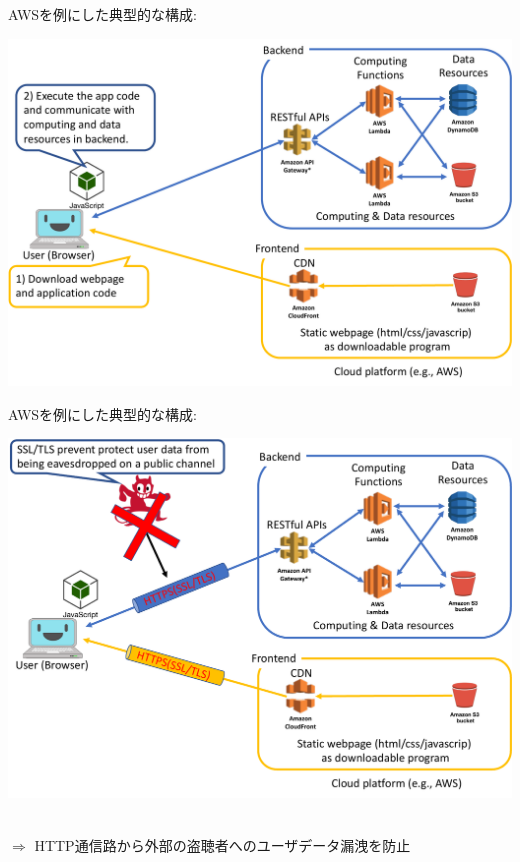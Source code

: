\documentclass[12pt,dvipdfmx]{beamer}
\begin{document}
\begin{frame}
AWSを例にした典型的な構成:
\begin{center}
\includegraphics[width=0.85\linewidth]{Figs/spa1.pdf}
\end{center}
\end{frame}

\begin{frame}
AWSを例にした典型的な構成:
\begin{center}
\includegraphics[width=0.85\linewidth]{Figs/spa2.pdf}
\end{center}
\\
$\Rightarrow$ HTTP通信路から外部の盗聴者へのユーザデータ漏洩を防止
\end{frame}
\end{document}
